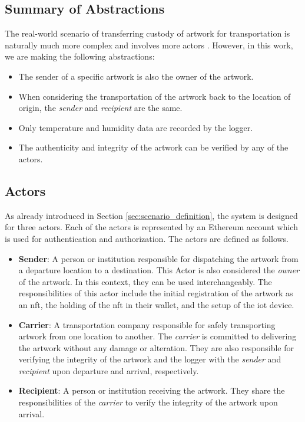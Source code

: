\subsection*{Summary of Abstractions}
The real-world scenario of transferring custody of artwork for transportation is naturally much more complex and involves more actors \cite{artintransit}. However, in this work, we are making the following abstractions:
\begin{itemize}
    \item The sender of a specific artwork is also the owner of the artwork.
    \item When considering the transportation of the artwork back to the location of origin, the \textit{sender} and \textit{recipient} are the same.
    \item Only temperature and humidity data are recorded by the logger.
    \item The authenticity and integrity of the artwork can be verified by any of the actors.
\end{itemize}

\subsection{Actors}
As already introduced in Section \ref{sec:scenario_definition}, the system is designed for three actors. Each of the actors is represented by an Ethereum account which is used for authentication and authorization. The actors are defined as follows.

\begin{itemize}[align=left, font=\itshape]
    \item \textbf{Sender}: A person or institution responsible for dispatching the artwork from a departure location to a destination. This Actor is also considered the \textit{owner} of the artwork. In this context, they can be used interchangeably. The responsibilities of this actor include the initial registration of the artwork as an \gls{nft}, the holding of the \gls{nft} in their wallet, and the setup of the \gls{iot} device.

    \item \textbf{Carrier}: A transportation company responsible for safely transporting artwork from one location to another. The \textit{carrier} is committed to delivering the artwork without any damage or alteration. They are also responsible for verifying the integrity of the artwork and the logger with the \textit{sender} and \textit{recipient} upon departure and arrival, respectively.

    \item \textbf{Recipient}: A person or institution receiving the artwork. They share the responsibilities of the \textit{carrier} to verify the integrity of the artwork upon arrival. 
\end{itemize}

